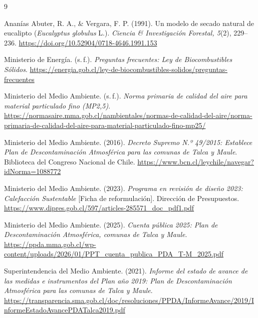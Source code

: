 \documentclass[11pt,a4paper]{article}
\begin{document}
\begin{thebibliography}{9}

Ananías Abuter, R. A., \& Vergara, F. P. (1991). Un modelo de secado natural de eucalipto (\textit{Eucalyptus globulus} L.). \textit{Ciencia \& Investigación Forestal, 5}(2), 229--236. \url{https://doi.org/10.52904/0718-4646.1991.153}

Ministerio de Energía. (s.\,f.). \textit{Preguntas frecuentes: Ley de Biocombustibles Sólidos}. \url{https://energia.gob.cl/ley-de-biocombustibles-solidos/preguntas-frecuentes}

Ministerio del Medio Ambiente. (s.\,f.). \textit{Norma primaria de calidad del aire para material particulado fino (MP2,5)}. \url{https://normasaire.mma.gob.cl/nambientales/normas-de-calidad-del-aire/norma-primaria-de-calidad-del-aire-para-material-particulado-fino-mp25/}

Ministerio del Medio Ambiente. (2016). \textit{Decreto Supremo N.º 49/2015: Establece Plan de Descontaminación Atmosférica para las comunas de Talca y Maule}. Biblioteca del Congreso Nacional de Chile. \url{https://www.bcn.cl/leychile/navegar?idNorma=1088772}

Ministerio del Medio Ambiente. (2023). \textit{Programa en revisión de diseño 2023: Calefacción Sustentable} [Ficha de reformulación]. Dirección de Presupuestos. \url{https://www.dipres.gob.cl/597/articles-285571_doc_pdf1.pdf}

Ministerio del Medio Ambiente. (2025). \textit{Cuenta pública 2025: Plan de Descontaminación Atmosférica, comunas de Talca y Maule}. \url{https://ppda.mma.gob.cl/wp-content/uploads/2026/01/PPT_cuenta_publica_PDA_T-M_2025.pdf}

Superintendencia del Medio Ambiente. (2021). \textit{Informe del estado de avance de las medidas e instrumentos del Plan año 2019: Plan de Descontaminación Atmosférica para las comunas de Talca y Maule}. \url{https://transparencia.sma.gob.cl/doc/resoluciones/PPDA/InformeAvance/2019/InformeEstadoAvancePDATalca2019.pdf}

\end{thebibliography}
\end{document}
